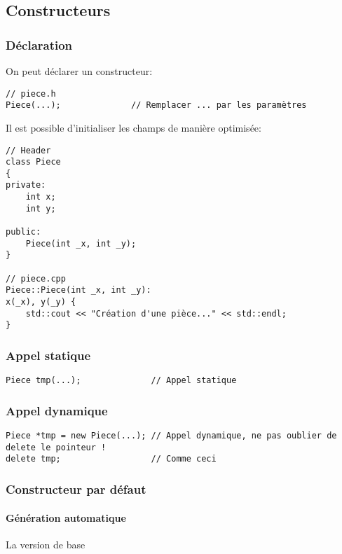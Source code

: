 \documentclass[10pt,a4paper,french]{article}
\begin{document}
\subsection{Constructeurs}

\subsubsection{Déclaration}

On peut déclarer un constructeur:

\begin{verbatim}
// piece.h
Piece(...);              // Remplacer ... par les paramètres
\end{verbatim}

Il est possible d'initialiser les champs de manière optimisée:
\begin{verbatim}
// Header
class Piece
{
private:
    int x;
    int y;

public:
    Piece(int _x, int _y);
}

// piece.cpp
Piece::Piece(int _x, int _y):
x(_x), y(_y) {
    std::cout << "Création d'une pièce..." << std::endl;
}
\end{verbatim}

\subsubsection{Appel statique}

\begin{verbatim}
Piece tmp(...);              // Appel statique
\end{verbatim}

\subsubsection{Appel dynamique}

\begin{verbatim}
Piece *tmp = new Piece(...); // Appel dynamique, ne pas oublier de delete le pointeur !
delete tmp;                  // Comme ceci
\end{verbatim}

\subsubsection{Constructeur par défaut}

\paragraph{Génération automatique}
La version de base 
\end{document}
